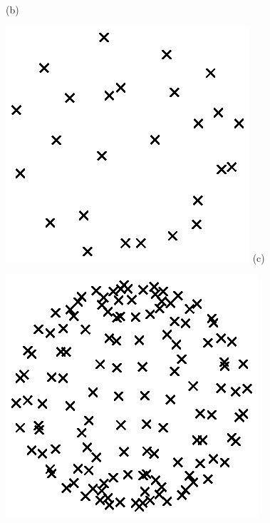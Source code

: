 \documentclass[authoryear,preprint,12pt]{elsarticle}
\begin{document}
\begin{figure}[!htbp]
\begin{center}
\begin{minipage}[]{0.42\textwidth}
      (b)
    \end{minipage}
    \begin{minipage}[]{0.42\textwidth}
      \centering
      \includegraphics[width=\textwidth]{cloudlowden.eps}
      (c)
    \end{minipage}
    \begin{minipage}[]{0.42\textwidth}
      \centering
      \includegraphics[width=\textwidth]{cloudhighden.eps}

\end{minipage}
\end{center}
\end{figure}
\end{document}
